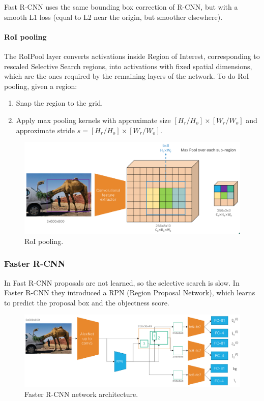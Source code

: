 Fast R-CNN uses the same bounding box correction of R-CNN, but with a smooth L1 loss (equal to L2 near the origin, but smoother elsewhere).

\paragraph{RoI pooling}
The RoIPool layer converts activations inside Region of Interest, corresponding to rescaled Selective Search regions, into activations with fixed spatial dimensions, which are the ones required by the remaining layers of the network.
To do RoI pooling, given a region:
\begin{enumerate}
  \item Snap the region to the grid.
  \item Apply max pooling kernels with approximate size $[H_r/H_o]\times [W_r/W_o]$ and approximate stride $s = [H_r/H_o]\times[W_r/W_o]$.
\end{enumerate}

\begin{figure}[htbp]
  \centering
  \includegraphics[width=0.6\linewidth]{./img/roipool.png}
  \caption{RoI pooling.}
\end{figure}

\subsubsection{Faster R-CNN}

In Fast R-CNN proposals are not learned, so the selective search is slow.
In Faster R-CNN they introduced a RPN (Region Proposal Network), which learns to predict the proposal box and the objectness score.

\begin{figure}[htbp]
  \centering
  \includegraphics[width=0.6\linewidth]{./img/fasterrcnn.png}
  \caption{Faster R-CNN network architecture.}
\end{figure}

